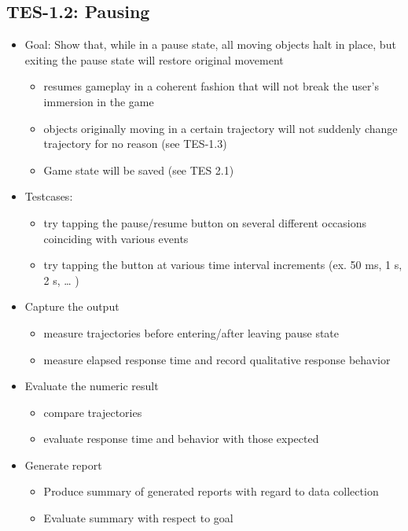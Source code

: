 \subsection{TES-1.2: Pausing }
\begin{itemize}
\item Goal: Show that, while in a pause state, all moving objects halt in
place, but exiting the pause state will restore original movement 

\begin{itemize}
\item resumes gameplay in a coherent fashion that will not break the user\textquoteright{}s
immersion in the game 
\item objects originally moving in a certain trajectory will not suddenly
change trajectory for no reason (see TES-1.3) 
\item Game state will be saved (see TES 2.1) 
\end{itemize}
\item Testcases: 

\begin{itemize}
\item try tapping the pause/resume button on several different occasions
coinciding with various events 
\item try tapping the button at various time interval increments (ex. 50
ms, 1 s, 2 s, \ldots{} ) 
\end{itemize}
\item Capture the output 

\begin{itemize}
\item measure trajectories before entering/after leaving pause state 
\item measure elapsed response time and record qualitative response behavior 
\end{itemize}
\item Evaluate the numeric result 

\begin{itemize}
\item compare trajectories 
\item evaluate response time and behavior with those expected 
\end{itemize}
\item Generate report 

\begin{itemize}
\item Produce summary of generated reports with regard to data collection 
\item Evaluate summary with respect to goal
\end{itemize}
\end{itemize}

